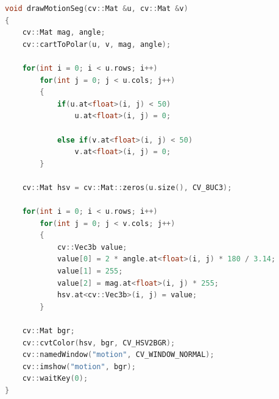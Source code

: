 \documentclass[a4paper,11]{article}
\begin{document}
\begin{lstlisting}[language=C++]
void drawMotionSeg(cv::Mat &u, cv::Mat &v)
{
    cv::Mat mag, angle;
    cv::cartToPolar(u, v, mag, angle);
    
    for(int i = 0; i < u.rows; i++)
        for(int j = 0; j < u.cols; j++)
        {
            if(u.at<float>(i, j) < 50)
                u.at<float>(i, j) = 0;
            
            else if(v.at<float>(i, j) < 50)
                v.at<float>(i, j) = 0;
        }
    
    cv::Mat hsv = cv::Mat::zeros(u.size(), CV_8UC3);
    
    for(int i = 0; i < u.rows; i++)
        for(int j = 0; j < v.cols; j++)
        {
            cv::Vec3b value;
            value[0] = 2 * angle.at<float>(i, j) * 180 / 3.14;
            value[1] = 255;
            value[2] = mag.at<float>(i, j) * 255; 
            hsv.at<cv::Vec3b>(i, j) = value;
        }
    
    cv::Mat bgr;
    cv::cvtColor(hsv, bgr, CV_HSV2BGR);
    cv::namedWindow("motion", CV_WINDOW_NORMAL);
    cv::imshow("motion", bgr);
    cv::waitKey(0);
}
\end{lstlisting}
\end{document}

